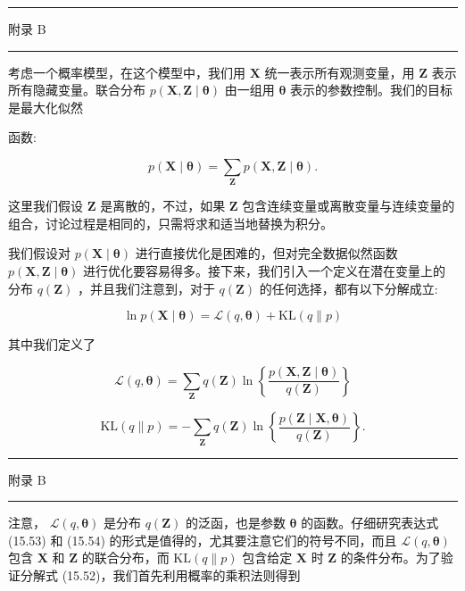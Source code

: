 \documentclass[10pt]{report}
\newcommand{\HRule}{\begin{center}\rule{0.9\linewidth}{0.2mm}\end{center}}
\begin{document}
\HRule

附录 B

\HRule

考虑一个概率模型，在这个模型中，我们用 \(\mathbf{X}\) 统一表示所有观测变量，用 \(\mathbf{Z}\) 表示所有隐藏变量。联合分布 \(p\left( {\mathbf{X},\mathbf{Z} \mid  \mathbf{\theta }}\right)\) 由一组用 \(\mathbf{\theta }\) 表示的参数控制。我们的目标是最大化似然

函数:

\[
p\left( {\mathbf{X} \mid  \mathbf{\theta }}\right)  = \mathop{\sum }\limits_{\mathbf{Z}}p\left( {\mathbf{X},\mathbf{Z} \mid  \mathbf{\theta }}\right) . \tag{15.51}
\]

这里我们假设 \(\mathbf{Z}\) 是离散的，不过，如果 \(\mathbf{Z}\) 包含连续变量或离散变量与连续变量的组合，讨论过程是相同的，只需将求和适当地替换为积分。

我们假设对 \(p\left( {\mathbf{X} \mid  \mathbf{\theta }}\right)\) 进行直接优化是困难的，但对完全数据似然函数 \(p\left( {\mathbf{X},\mathbf{Z} \mid  \mathbf{\theta }}\right)\) 进行优化要容易得多。接下来，我们引入一个定义在潜在变量上的分布 \(q\left( \mathbf{Z}\right)\) ，并且我们注意到，对于 \(q\left( \mathbf{Z}\right)\) 的任何选择，都有以下分解成立:

\[
\ln p\left( {\mathbf{X} \mid  \mathbf{\theta }}\right)  = \mathcal{L}\left( {q,\mathbf{\theta }}\right)  + \mathrm{{KL}}\left( {q\parallel p}\right)  \tag{15.52}
\]

其中我们定义了

\[
\mathcal{L}\left( {q,\mathbf{\theta }}\right)  = \mathop{\sum }\limits_{\mathbf{Z}}q\left( \mathbf{Z}\right) \ln \left\{  \frac{p\left( {\mathbf{X},\mathbf{Z} \mid  \mathbf{\theta }}\right) }{q\left( \mathbf{Z}\right) }\right\}   \tag{15.53}
\]

\[
\mathrm{{KL}}\left( {q\parallel p}\right)  =  - \mathop{\sum }\limits_{\mathbf{Z}}q\left( \mathbf{Z}\right) \ln \left\{  \frac{p\left( {\mathbf{Z} \mid  \mathbf{X},\mathbf{\theta }}\right) }{q\left( \mathbf{Z}\right) }\right\}  . \tag{15.54}
\]

\HRule

附录 B

\HRule

注意， \(\mathcal{L}\left( {q,\mathbf{\theta }}\right)\) 是分布 \(q\left( \mathbf{Z}\right)\) 的泛函，也是参数 \(\mathbf{\theta }\) 的函数。仔细研究表达式 (15.53) 和 (15.54) 的形式是值得的，尤其要注意它们的符号不同，而且 \(\mathcal{L}\left( {q,\mathbf{\theta }}\right)\) 包含 \(\mathbf{X}\) 和 \(\mathbf{Z}\) 的联合分布，而 \(\mathrm{{KL}}\left( {q\parallel p}\right)\) 包含给定 \(\mathbf{X}\) 时 \(\mathbf{Z}\) 的条件分布。为了验证分解式 (15.52)，我们首先利用概率的乘积法则得到
\end{document}
